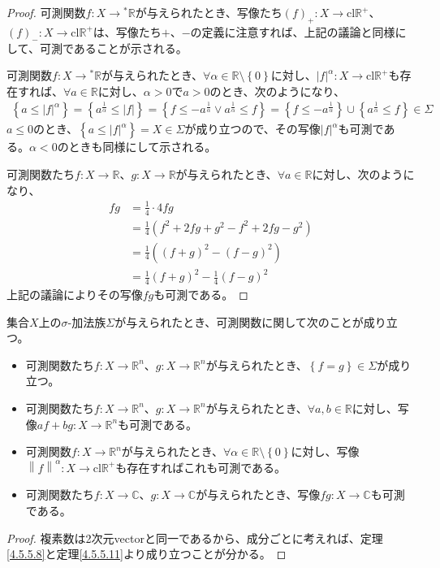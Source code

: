 \documentclass[dvipdfmx]{jsarticle}
\begin{document}
\begin{proof}
可測関数$f:X \rightarrow{}^{*}\mathbb{R}$が与えられたとき、写像たち$(f)_{+}:X \rightarrow \mathrm{cl}\mathbb{R}^{+}$、$(f)_{-}:X \rightarrow \mathrm{cl}\mathbb{R}^{+}$は、写像たち$+$、$-$の定義に注意すれば、上記の議論と同様にして、可測であることが示される。\par
可測関数$f:X \rightarrow{}^{*}\mathbb{R}$が与えられたとき、$\forall\alpha \in \mathbb{R} \setminus \left\{ 0 \right\}$に対し、$|f|^{\alpha}:X \rightarrow \mathrm{cl}\mathbb{R}^{+}$も存在すれば、$\forall a \in \mathbb{R}$に対し、$\alpha > 0$で$a > 0$のとき、次のようになり、
\begin{align*}
\left\{ a \leq |f|^{\alpha} \right\} = \left\{ a^{\frac{1}{\alpha}} \leq |f| \right\} = \left\{ f \leq - a^{\frac{1}{\alpha}} \vee a^{\frac{1}{\alpha}} \leq f \right\} = \left\{ f \leq - a^{\frac{1}{\alpha}} \right\} \cup \left\{ a^{\frac{1}{\alpha}} \leq f \right\} \in \varSigma
\end{align*}
$a \leq 0$のとき、$\left\{ a \leq |f|^{\alpha} \right\} = X \in \varSigma$が成り立つので、その写像$|f|^{\alpha}$も可測である。$\alpha < 0$のときも同様にして示される。\par
可測関数たち$f:X \rightarrow \mathbb{R}$、$g:X \rightarrow \mathbb{R}$が与えられたとき、$\forall a \in \mathbb{R}$に対し、次のようになり、
\begin{align*}
fg &= \frac{1}{4} \cdot 4fg\\
&= \frac{1}{4}\left( f^{2} + 2fg + g^{2} - f^{2} + 2fg - g^{2} \right)\\
&= \frac{1}{4}\left( (f + g)^{2} - (f - g)^{2} \right)\\
&= \frac{1}{4}(f + g)^{2} - \frac{1}{4}(f - g)^{2}
\end{align*}
上記の議論によりその写像$fg$も可測である。
\end{proof}
\begin{thm}\label{4.5.5.12}
集合$X$上の$\sigma$-加法族$\varSigma$が与えられたとき、可測関数に関して次のことが成り立つ。
\begin{itemize}
\item
  可測関数たち$f:X \rightarrow \mathbb{R}^{n}$、$g:X \rightarrow \mathbb{R}^{n}$が与えられたとき、$\left\{ f = g \right\} \in \varSigma$が成り立つ。
\item
  可測関数たち$f:X \rightarrow \mathbb{R}^{n}$、$g:X \rightarrow \mathbb{R}^{n}$が与えられたとき、$\forall a,b \in \mathbb{R}$に対し、写像$af + bg:X \rightarrow \mathbb{R}^{n}$も可測である。
\item
  可測関数$f:X \rightarrow \mathbb{R}^{n}$が与えられたとき、$\forall\alpha \in \mathbb{R} \setminus \left\{ 0 \right\}$に対し、写像$\left\| f \right\|^{\alpha}:X \rightarrow \mathrm{cl}\mathbb{R}^{+}$も存在すればこれも可測である。
\item
  可測関数たち$f:X \rightarrow \mathbb{C}$、$g:X \rightarrow \mathbb{C}$が与えられたとき、写像$fg:X \rightarrow \mathbb{C}$も可測である。
\end{itemize}
\end{thm}
\begin{proof}
複素数は2次元vectorと同一であるから、成分ごとに考えれば、定理\ref{4.5.5.8}と定理\ref{4.5.5.11}より成り立つことが分かる。
\end{proof}
\end{document}
